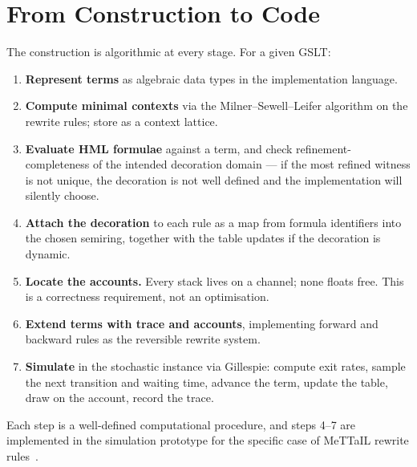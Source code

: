 \section{From Construction to Code}

The construction is algorithmic at every stage.  For a given GSLT:

\begin{enumerate}[itemsep=4pt]
  \item \textbf{Represent terms} as algebraic data types in the
        implementation language.

  \item \textbf{Compute minimal contexts} via the Milner--Sewell--Leifer
        algorithm on the rewrite rules; store as a context lattice.

  \item \textbf{Evaluate HML formulae} against a term, and check
        refinement-completeness of the intended decoration domain --- if
        the most refined witness is not unique, the decoration is not
        well defined and the implementation will silently choose.

  \item \textbf{Attach the decoration} to each rule as a map from formula
        identifiers into the chosen semiring, together with the table
        updates if the decoration is dynamic.

  \item \textbf{Locate the accounts.}  Every stack lives on a channel;
        none floats free.  This is a correctness requirement, not an
        optimisation.

  \item \textbf{Extend terms with trace and accounts}, implementing
        forward and backward rules as the reversible rewrite system.

  \item \textbf{Simulate} in the stochastic instance via Gillespie:
        compute exit rates, sample the next transition and waiting time,
        advance the term, update the table, draw on the account, record
        the trace.
\end{enumerate}

Each step is a well-defined computational procedure, and steps 4--7 are
implemented in the simulation prototype for the specific case of MeTTaIL
rewrite rules~\cite{StochSim}.


